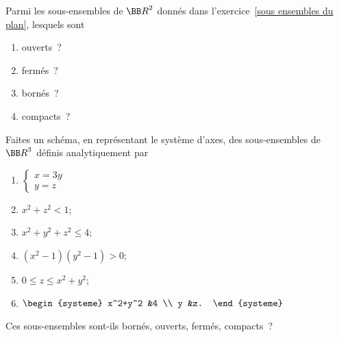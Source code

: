 \documentclass[12pt,french,oneside,a4paper]{memoir} %
\begin{document}
\begin{exo}
  Parmi les sous-ensembles de ${\BB R}^2$ donnés dans l'exercice~\ref{sous ensembles du plan}, lesquels sont
  \begin{multicols}{4}
    \begin{enumerate}
    \item ouverts~?
    \item fermés~?
    \item bornés~?
    \item compacts~?
    \end{enumerate}
  \end{multicols}
\end{exo}

\begin{exo}
  Faites un schéma, en représentant le système d'axes, des sous-ensembles de ${\BB R}^3$ définis analytiquement par
  \begin{multicols}{2}
    \begin{enumerate}
    \item
      \begin{math}
        \begin{cases}
          x = 3y \\
          y = z
        \end{cases}
      \end{math}
    \item $x^2+z^2 < 1$;
    \item $x^2+y^2+z^2 \leq 4$;
    \item $(x^2-1)(y^2-1) > 0$;
    \item $0 \leq z \leq x^2+y^2$;
    \item
      \begin{math}
        \begin{systeme}
          x^2+y^2 &4 \\
          y &z.
        \end{systeme}
      \end{math}
    \end{enumerate}
  \end{multicols}
  Ces sous-ensembles sont-ils bornés, ouverts, fermés, compacts~?
\end{exo}
\end{document}
